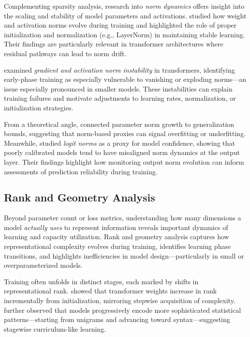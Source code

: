 Complementing sparsity analysis, research into \textit{norm dynamics} offers insight into the scaling and stability of model parameters and activations. \citet{mishkin2016goodinit} studied how weight and activation norms evolve during training and highlighted the role of proper initialization and normalization (e.g., LayerNorm) in maintaining stable learning. Their findings are particularly relevant in transformer architectures where residual pathways can lead to norm drift.

\citet{liu2020understanding} examined \textit{gradient and activation norm instability} in transformers, identifying early-phase training as especially vulnerable to vanishing or exploding norms—an issue especially pronounced in smaller models. These instabilities can explain training failures and motivate adjustments to learning rates, normalization, or initialization strategies.

From a theoretical angle, \citet{arora2018theoretical} connected parameter norm growth to generalization bounds, suggesting that norm-based proxies can signal overfitting or underfitting. Meanwhile, \citet{zhang2021calibration} studied \textit{logit norms} as a proxy for model confidence, showing that poorly calibrated models tend to have misaligned norm dynamics at the output layer. Their findings highlight how monitoring output norm evolution can inform assessments of prediction reliability during training.


\subsection{Rank and Geometry Analysis}

Beyond parameter count or loss metrics, understanding how many dimensions a model \textit{actually uses} to represent information reveals important dynamics of learning and capacity utilization. Rank and geometry analysis captures how representational complexity evolves during training, identifies learning phase transitions, and highlights inefficiencies in model design—particularly in small or overparameterized models.

Training often unfolds in distinct stages, each marked by shifts in representational rank. \citet{boix-adsera2023rank} showed that transformer weights increase in rank incrementally from initialization, mirroring stepwise acquisition of complexity. \citet{belrose2024neural} further observed that models progressively encode more sophisticated statistical patterns—starting from unigrams and advancing toward syntax—suggesting stagewise curriculum-like learning.

